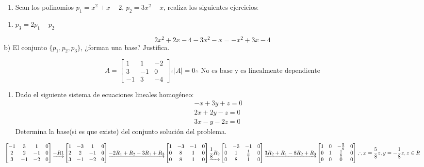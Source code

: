 \documentclass[
  11,
]{article}
\providecommand{\tightlist}{%
  \setlength{\itemsep}{0pt}\setlength{\parskip}{0pt}}
\begin{document}
\begin{enumerate}
\def\labelenumi{\arabic{enumi}.}
\setcounter{enumi}{2}
\tightlist
\item
  Sean los polinomios \(p_1 = x^2 + x - 2\), \(p_2 = 3x^2-x\), realiza
  los siguientes ejercicios:
\end{enumerate}

\begin{enumerate}
\def\labelenumi{\alph{enumi})}
\tightlist
\item
  \(p_3 = 2p_1 - p_2\)
\end{enumerate}

\[
  2x^2 + 2x - 4 - 3x^2 - x = -x^2+3x-4
  \] b) El conjunto \(\{p_1,p_2,p_3\}\), ¿forman una base? Justifica.

\[
  A = \begin{bmatrix}1 & 1 & -2 \\ 3&-1&0\\-1&3&-4\end{bmatrix} \therefore |A| = 0 \therefore \text{ No es base y es linealmente dependiente}
  \]

\begin{enumerate}
\def\labelenumi{\arabic{enumi}.}
\setcounter{enumi}{3}
\tightlist
\item
  Dado el siguiente sistema de ecuaciones lineales homogéneo:
  \[\begin{align*}-x+3y+z = 0 \\ 2x+2y-z=0\\3x-y-2z=0\end{align*}\]
  Determina la base(si es que existe) del conjunto solución del
  problema.
\end{enumerate}

\[
  \begin{bmatrix}-1&3&1&0\\2&2&-1&0\\3&-1&-2&0\end{bmatrix} \underrightarrow{-R1}\begin{bmatrix}1&-3&1&0\\2&2&-1&0\\3&-1&-2&0\end{bmatrix} \underrightarrow{-2R_1 + R_2 \\ -3R_1 + R_3} \\ \begin{bmatrix}1&-3&-1&0\\0&8&1&0\\0&8&1&0\end{bmatrix} \underrightarrow{\frac{1}{8}R_2}\begin{bmatrix}1&-3&-1&0\\0&1&\frac{1}{8}&0\\0&8&1&0\end{bmatrix}\underrightarrow{3R_2 + R_1 \\ -8R_2 +R_3} \\\begin{bmatrix}1 &0&-\frac{5}{6}&0\\0&1&\frac{1}{8}&0\\0&0&0&0\end{bmatrix} \therefore x = \frac{5}{8}z, y = -\frac{1}{8}z, z\in R
  \]
\end{document}
